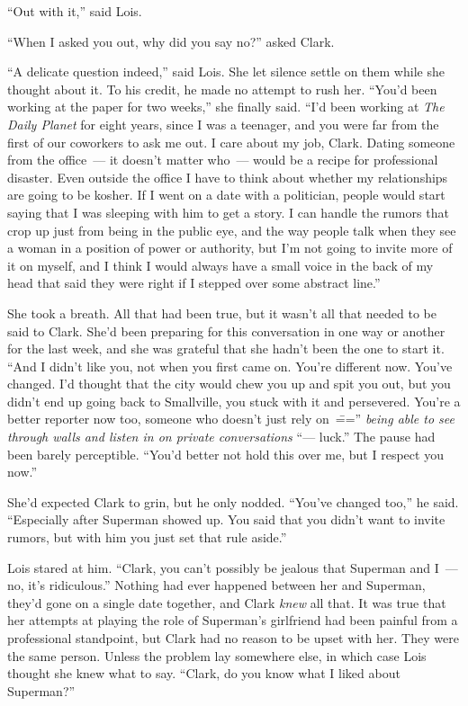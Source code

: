 \documentclass[ebook,12pt]{memoir}
\begin{document}
``Out with it,'' said Lois.

``When I asked you out, why did you say no?'' asked Clark.

``A delicate question indeed,'' said Lois. She let silence settle on
them while she thought about it. To his credit, he made no attempt to
rush her. ``You'd been working at the paper for two weeks,'' she finally
said. ``I'd been working at \emph{The Daily Planet} for eight years,
since I was a teenager, and you were far from the first of our coworkers
to ask me out. I care about my job, Clark. Dating someone from the
office~--- it doesn't matter who~--- would be a recipe for professional
disaster. Even outside the office I have to think about whether my
relationships are going to be kosher. If I went on a date with a
politician, people would start saying that I was sleeping with him to
get a story. I can handle the rumors that crop up just from being in the
public eye, and the way people talk when they see a woman in a position
of power or authority, but I'm not going to invite more of it on myself,
and I think I would always have a small voice in the back of my head
that said they were right if I stepped over some abstract line.''

She took a breath. All that had been true, but it wasn't all that needed
to be said to Clark. She'd been preparing for this conversation in one
way or another for the last week, and she was grateful that she hadn't
been the one to start it. ``And I didn't like you, not when you first
came on. You're different now. You've changed. I'd thought that the city
would chew you up and spit you out, but you didn't end up going back to
Smallville, you stuck with it and persevered. You're a better reporter
now too, someone who doesn't just rely on~\==='' \emph{being able to see
through walls and listen in on private conversations} ``--- luck.'' The
pause had been barely perceptible. ``You'd better not hold this over me,
but I respect you now.''

She'd expected Clark to grin, but he only nodded. ``You've changed
too,'' he said. ``Especially after Superman showed up. You said that you
didn't want to invite rumors, but with him you just set that rule
aside.''

Lois stared at him. ``Clark, you can't possibly be jealous that Superman
and I~--- no, it's ridiculous.'' Nothing had ever happened between her
and Superman, they'd gone on a single date together, and Clark
\emph{knew} all that. It was true that her attempts at playing the role
of Superman's girlfriend had been painful from a professional
standpoint, but Clark had no reason to be upset with her. They were the
same person. Unless the problem lay somewhere else, in which case Lois
thought she knew what to say. ``Clark, do you know what I liked about
Superman?''
\end{document}
